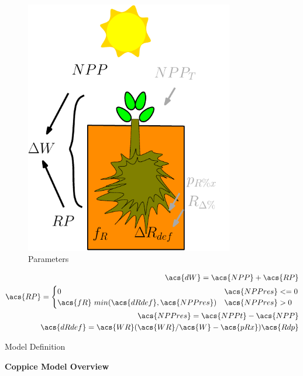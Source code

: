 \documentclass[10pt]{article}
\begin{document}
\begin{figure}[!ht]
  \centering
\begin{subfigure}[b]{.2\linewidth}
  \includegraphics[width=1.0\linewidth]{img/tree_pics_10}
  \caption{Parameters}
  \label{fig:coppice-img}
\end{subfigure}
\quad
\begin{subtable}[b]{.75\linewidth}
\begin{align}
\acs{dW}=\acs{NPP}+\acs{RP} \\
\acs{RP} = \begin{cases} 0 & \acs{NPPres} <=0 \\
\acs{fR} ~ min (\acs{dRdef} ,\acs{NPPres}) & \acs{NPPres} > 0  
\end{cases} \\
\acs{NPPres} = \acs{NPPt}-\acs{NPP} \\
\acs{dRdef} = \acs{WR}(\acs{WR}/\acs{W} - \acs{pRx})\acs{Rdp}
\end{align}
\caption{Model Definition}
\end{subtable}
\caption{\textbf{Coppice Model Overview}}
  \label{fig:coppice}
\end{figure}
\end{document}
